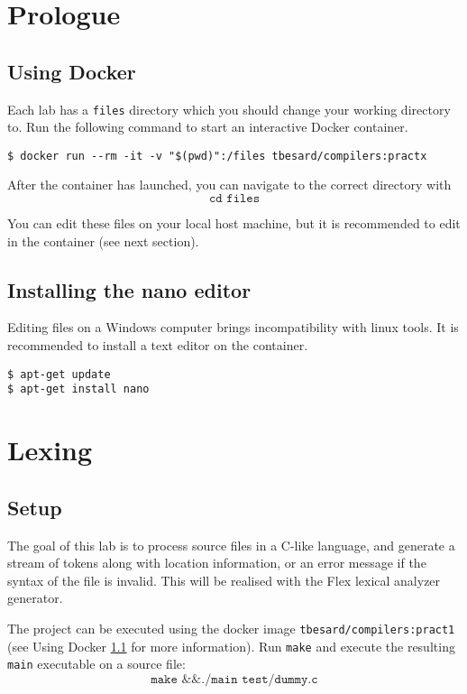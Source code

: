 \documentclass{report}
\begin{document}
	\tableofcontents
	

	\chapter{Prologue}
	\section{Using Docker}
	\label{sec:using_docker}
	Each lab has a \texttt{files} directory which you should change your working directory to. Run the following command to start an interactive Docker container. 
	\begin{lstlisting}
$ docker run --rm -it -v "$(pwd)":/files tbesard/compilers:practx
	\end{lstlisting}
	After the container has launched, you can navigate to the correct directory with 
	$$\texttt{cd files}$$
	
	You can edit these files on your local host machine, but it is recommended to edit in the container (see next section).
	\section{Installing the nano editor}
	Editing files on a Windows computer brings incompatibility with linux tools. It is recommended to install a text editor on the container.
	\begin{lstlisting}
$ apt-get update
$ apt-get install nano
	\end{lstlisting}
	\chapter{Lexing}
	\section{Setup}
	The goal of this lab is to process source files in a C-like language, and generate a stream of tokens along with location information, or an error message if the syntax of the file is invalid. This will be realised with the Flex lexical analyzer generator.
	
	The project can be executed using the docker image \texttt{tbesard/compilers:pract1} (see Using Docker \ref{sec:using_docker} for more information). Run \texttt{make} and execute the resulting \texttt{main} executable on a source file:
	$$\texttt{make \&\& ./main test/dummy.c}$$ 
	
\end{document}
